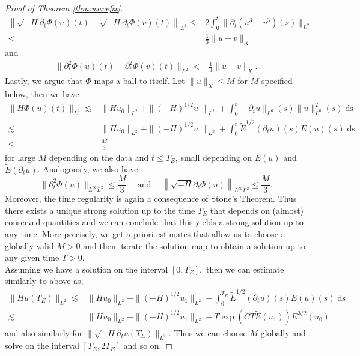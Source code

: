 \documentclass[11pt, oneside]{article}   	%
\newcommand{\tmop}[1]{\ensuremath{\operatorname{#1}}}
\begin{document}
\begin{proof}[Proof of Theorem \ref{thm:wavefix}]
\begin{align*}
	\left\| \sqrt{- H} \partial_t \Phi (u) (t) - \sqrt{- H} \partial_t \Phi (v)
	(t) \right\|_{L^2}  \le &2\int_{0}^{t} \|
	\partial_t (u^3 - v^3) (s) \|_{L^2}\\
	< & \frac{1}{3} \| u - v \|_X
	\end{align*}
	and
	\begin{align*}
\| \partial^2_t \Phi (u) (t) - \partial_t^2 \Phi (v) (t) \|_{L^2}  < & \frac{1}{3} \| u - v \|_X .
	\end{align*}
	Lastly, we argue that $\Phi$ maps a ball to itself. Let $\| u \|_X \le M$
	for $M$ specified below, then we have
	\begin{align*}
	\| H \Phi (u) (t) \|_{L^2}  \lesssim & \| H u_0 \|_{L^2} + \| (- H)^{1 / 2}
	u_1 \|_{L^2} +\int_{0}^{t} \| \partial_t u \|_{L^6} (s)
	\| u \|^2_{L^6} (s) \tmop{ds}\\
	\lesssim & \| H u_0 \|_{L^2} + \| (- H)^{1 / 2} u_1 \|_{L^2} +
	\int_{0}^{t} \tilde{E}^{1 / 2} (\partial_t u) (s) E (u)
	(s) \tmop{ds}\\
	\le & \frac{M}{3}
	\end{align*}
	for large $M$ depending on the data and $t \le T_E$,  small depending on $E
	(u)$ and $\tilde{E} (\partial_t u)$.
	Analogously, we also have
	\[ \| \partial^2_t \Phi (u) \|_{L^{\infty} L^2} \le \frac{M}{3} \quad
	\tmop{and} \quad \left\| \sqrt{- H} \partial_t \Phi (u)
	\right\|_{L^{\infty} L^2} \le \frac{M}{3} . \]
	Moreover, the time regularity is again a consequence of Stone's Theorem. Thus there exists a unique strong solution up to the time $T_E$ that depends on (almost)
	conserved quantities and we can conclude that this yields a strong solution up to
	any time.  More precisely, we get a priori estimates that allow us to choose a globally valid $M>0$ and then iterate the solution map to obtain a solution up to any given time $T>0.$\\
	Assuming we have a solution on the interval $[0,T_E],$ then we can estimate similarly to above as,
	\begin{align*}
	\|H u(T_E)\|_{L^2}\lesssim & \| H u_0 \|_{L^2} + \| (- H)^{1 / 2} u_1 \|_{L^2} +
	\int_{0}^{T_E} \tilde{E}^{1 / 2} (\partial_t u) (s) E (u)
	(s) \tmop{ds}\\
	\lesssim& \| H u_0 \|_{L^2} + \| (- H)^{1 / 2} u_1 \|_{L^2} +
	T \exp(CT\tilde{E}(u_1))  E^{3/2} (u_0)
	\end{align*}
	and also  similarly for $\|\sqrt{-H} \partial_t u(T_E)\|_{L^2}.$ Thus we can choose $M$ globally and solve on the interval $[T_E,2T_E]$  and so on.
	
\end{proof}
\end{document}
